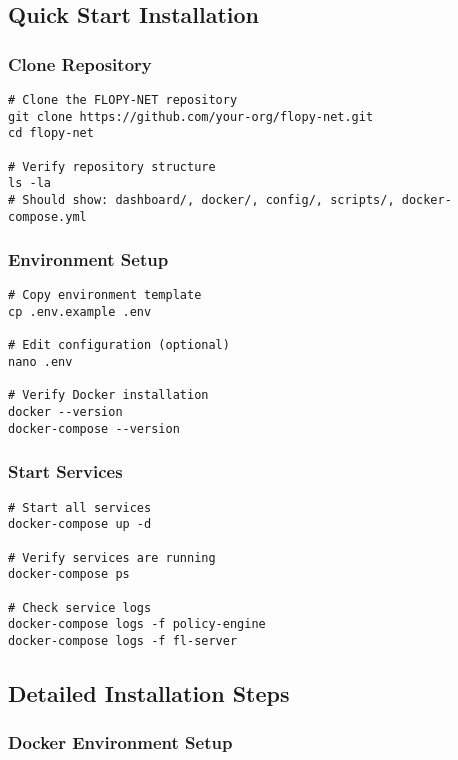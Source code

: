 \subsection{Quick Start Installation}

\subsubsection{Clone Repository}

\begin{lstlisting}[style=bashcode, caption=Repository Setup]
# Clone the FLOPY-NET repository
git clone https://github.com/your-org/flopy-net.git
cd flopy-net

# Verify repository structure
ls -la
# Should show: dashboard/, docker/, config/, scripts/, docker-compose.yml
\end{lstlisting}

\subsubsection{Environment Setup}

\begin{lstlisting}[style=bashcode, caption=Environment Configuration]
# Copy environment template
cp .env.example .env

# Edit configuration (optional)
nano .env

# Verify Docker installation
docker --version
docker-compose --version
\end{lstlisting}

\subsubsection{Start Services}

\begin{lstlisting}[style=bashcode, caption=Service Startup]
# Start all services
docker-compose up -d

# Verify services are running
docker-compose ps

# Check service logs
docker-compose logs -f policy-engine
docker-compose logs -f fl-server
\end{lstlisting}

\subsection{Detailed Installation Steps}

\subsubsection{Docker Environment Setup}

